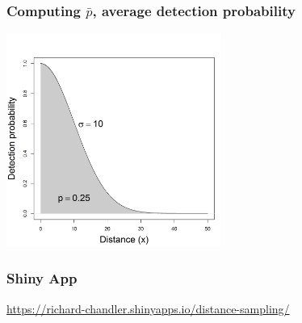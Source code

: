 \documentclass[color=usenames,dvipsnames,handout]{beamer}\usepackage[]{graphicx}\usepackage[]{xcolor}
\begin{document}
\begin{frame}
  \frametitle{Computing $\bar{p}$, average detection probability}
\begin{center}
  \includegraphics[width=7cm]{figs/detfun4}
\end{center}
\end{frame}





\begin{frame}
  \frametitle{Shiny App}
  \color{blue}
  \centering
  \url{
    https://richard-chandler.shinyapps.io/distance-sampling/
  } \\
\end{frame}








\end{document}
